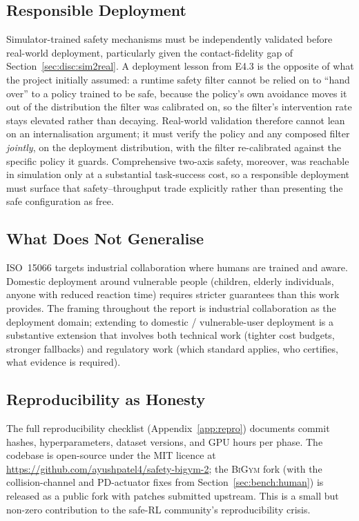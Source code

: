 \documentclass[11pt,a4paper]{report}
\newcommand{\iso}{ISO~15066}
\newcommand{\bigym}{\textsc{BiGym}}
\begin{document}
\subsection{Responsible Deployment}

Simulator-trained safety mechanisms must be independently validated
before real-world deployment, particularly given the contact-fidelity
gap of Section~\ref{sec:disc:sim2real}. A deployment lesson from E4.3
is the opposite of what the project initially assumed: a runtime
safety filter cannot be relied on to ``hand over'' to a policy trained
to be safe, because the policy's own avoidance moves it out of the
distribution the filter was calibrated on, so the filter's
intervention rate stays elevated rather than decaying. Real-world
validation therefore cannot lean on an internalisation argument; it
must verify the policy and any composed filter \emph{jointly}, on the
deployment distribution, with the filter re-calibrated against the
specific policy it guards. Comprehensive two-axis safety, moreover,
was reachable in simulation only at a substantial task-success cost,
so a responsible deployment must surface that safety--throughput trade
explicitly rather than presenting the safe configuration as free.

\subsection{What Does Not Generalise}

\iso{} targets industrial collaboration where humans are trained
and aware. Domestic deployment around vulnerable people (children, elderly individuals, anyone with
reduced reaction time) requires stricter guarantees than this work provides. The
framing throughout the report is industrial collaboration as the
deployment domain; extending to domestic / vulnerable-user
deployment is a substantive extension that involves both technical
work (tighter cost budgets, stronger fallbacks) and regulatory work
(which standard applies, who certifies, what evidence is required).

\subsection{Reproducibility as Honesty}

The full reproducibility checklist (Appendix~\ref{app:repro})
documents commit hashes, hyperparameters, dataset versions, and
GPU hours per phase. The codebase is open-source under the MIT
licence at \url{https://github.com/ayushpatel4/safety-bigym-2}; the \bigym{} fork (with the
collision-channel and PD-actuator fixes from
Section~\ref{sec:bench:human}) is released as a public fork with
patches submitted upstream. This is a small but non-zero
contribution to the safe-RL community's reproducibility crisis.
\end{document}
